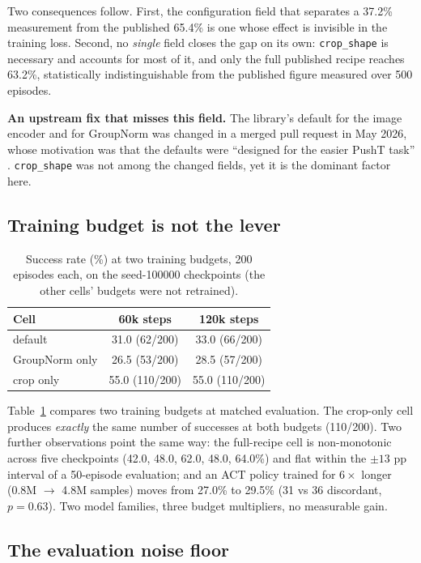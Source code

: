 \documentclass[11pt]{article}
\begin{document}
Two consequences follow. First, the configuration field that separates a 37.2\%
measurement from the published 65.4\% is one whose effect is invisible in the
training loss. Second, no \emph{single} field closes the gap on its own:
\texttt{crop\_shape} is necessary and accounts for most of it, and only the full
published recipe reaches 63.2\%, statistically indistinguishable from the published
figure measured over 500 episodes.

\textbf{An upstream fix that misses this field.} The library's default for the
image encoder and for GroupNorm was changed in a merged pull request in May 2026,
whose motivation was that the defaults were ``designed for the easier PushT task''
\cite{pr3202}. \texttt{crop\_shape} was not among the changed fields, yet it is the
dominant factor here.

\subsection{Training budget is not the lever}
\label{sec:budget}

\begin{table}[t]
\centering
\caption{Success rate (\%) at two training budgets, 200 episodes each, on the
seed-100000 checkpoints (the other cells' budgets were not retrained).}
\label{tab:budget}
\begin{tabular}{lcc}
\toprule
Cell & 60k steps & 120k steps \\
\midrule
default            & 31.0 (62/200) & 33.0 (66/200) \\
GroupNorm only     & 26.5 (53/200) & 28.5 (57/200) \\
crop only          & 55.0 (110/200) & 55.0 (110/200) \\
\bottomrule
\end{tabular}
\end{table}

Table~\ref{tab:budget} compares two training budgets at matched evaluation. The
crop-only cell produces \emph{exactly} the same number of successes at both budgets
(110/200). Two further observations point the same way: the full-recipe cell is
non-monotonic across five checkpoints (42.0, 48.0, 62.0, 48.0, 64.0\%) and flat
within the $\pm13$ pp interval of a 50-episode evaluation; and an ACT policy
trained for $6\times$ longer (0.8M $\rightarrow$ 4.8M samples) moves from 27.0\% to
29.5\% (31 vs 36 discordant, $p=0.63$). Two model families, three budget
multipliers, no measurable gain.

\subsection{The evaluation noise floor}
\label{sec:noise}
\end{document}
